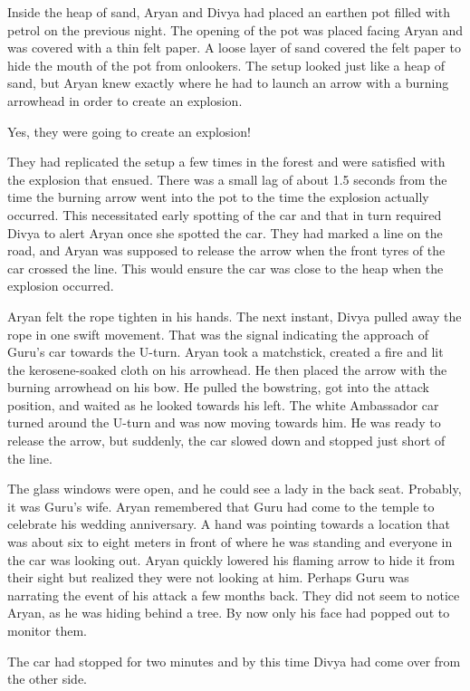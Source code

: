 Inside the heap of sand, Aryan and Divya had placed an earthen pot filled with
petrol on the previous night. The opening of the pot was placed facing Aryan and
was covered with a thin felt paper. A loose layer of sand covered the felt paper
to hide the mouth of the pot from onlookers. The setup looked just like a heap
of sand, but Aryan knew exactly where he had to launch an arrow with a burning
arrowhead in order to create an explosion.

Yes, they were going to create an explosion!

They had replicated the setup a few times in the forest and were satisfied with
the explosion that ensued. There was a small lag of about 1.5 seconds from the
time the burning arrow went into the pot to the time the explosion actually
occurred. This necessitated early spotting of the car and that in turn required
Divya to alert Aryan once she spotted the car. They had marked a line on the
road, and Aryan was supposed to release the arrow when the front tyres of the
car crossed the line. This would ensure the car was close to the heap when the
explosion occurred.

Aryan felt the rope tighten in his hands. The next instant, Divya pulled away
the rope in one swift movement. That was the signal indicating the approach of
Guru's car towards the U-turn. Aryan took a matchstick, created a fire and
lit the kerosene-soaked cloth on his arrowhead. He then placed the arrow
with the burning arrowhead on his bow. He pulled the bowstring, got into
the attack position, and waited as he looked towards his left. The white
Ambassador car turned around the U-turn and was now moving towards him. He was
ready to release the arrow, but suddenly, the car slowed down and stopped just
short of the line.

The glass windows were open, and he could see a lady in the back seat. Probably,
it was Guru's wife. Aryan remembered that Guru had come to the temple to
celebrate his wedding anniversary. A hand was pointing towards a location that
was about six to eight meters in front of where he was standing and everyone in
the car was looking out. Aryan quickly lowered his flaming arrow to hide it
from their sight but realized they were not looking at him. Perhaps Guru was
narrating the event of his attack a few months back. They did not seem to notice
Aryan, as he was hiding behind a tree. By now only his face had popped out to monitor
them.

The car had stopped for two minutes and by this time Divya had come over from the
other side.

